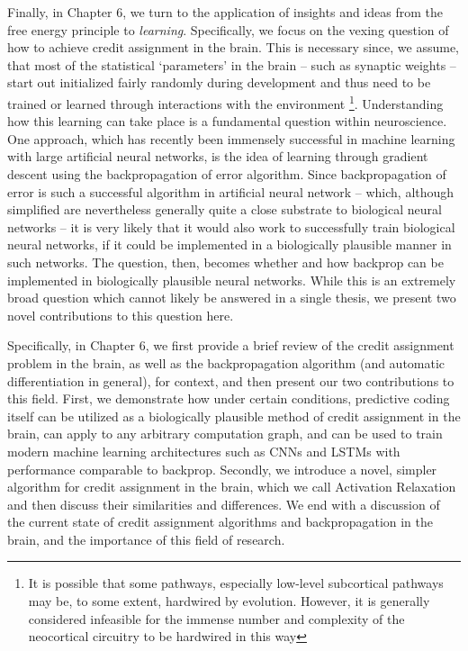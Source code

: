 Finally, in Chapter 6, we turn to the application of insights and ideas from the free energy principle to \emph{learning}. Specifically, we focus on the vexing question of how to achieve credit assignment in the brain. This is necessary since, we assume, that most of the statistical `parameters' in the brain -- such as synaptic weights -- start out initialized fairly randomly during development and thus need to be trained or learned through interactions with the environment \footnote{It is possible that some pathways, especially low-level subcortical pathways may be, to some extent, hardwired by evolution. However, it is generally considered infeasible for the immense number and complexity of the neocortical circuitry to be hardwired in this way}. Understanding how this learning can take place is a fundamental question within neuroscience. One approach, which has recently been immensely successful in machine learning with large artificial neural networks, is the idea of learning through gradient descent using the backpropagation of error algorithm. Since backpropagation of error is such a successful algorithm in artificial neural network -- which, although simplified are nevertheless generally quite a close substrate to biological neural networks -- it is very likely that it would also work to successfully train biological neural networks, if it could be implemented in a biologically plausible manner in such networks. The question, then, becomes whether and how backprop can be implemented in biologically plausible neural networks. While this is an extremely broad question which cannot likely be answered in a single thesis, we present two novel contributions to this question here.

Specifically, in Chapter 6, we first provide a brief review of the credit assignment problem in the brain, as well as the backpropagation algorithm (and automatic differentiation in general), for context, and then present our two contributions to this field. First, we demonstrate how under certain conditions, predictive coding itself can be utilized as a biologically plausible method of credit assignment in the brain, can apply to any arbitrary computation graph, and can be used to train modern machine learning architectures such as CNNs and LSTMs with performance comparable to backprop. Secondly, we introduce a novel, simpler algorithm for credit assignment in the brain, which we call Activation Relaxation and then discuss their similarities and differences. We end with a discussion of the current state of credit assignment algorithms and backpropagation in the brain, and the importance of this field of research.

